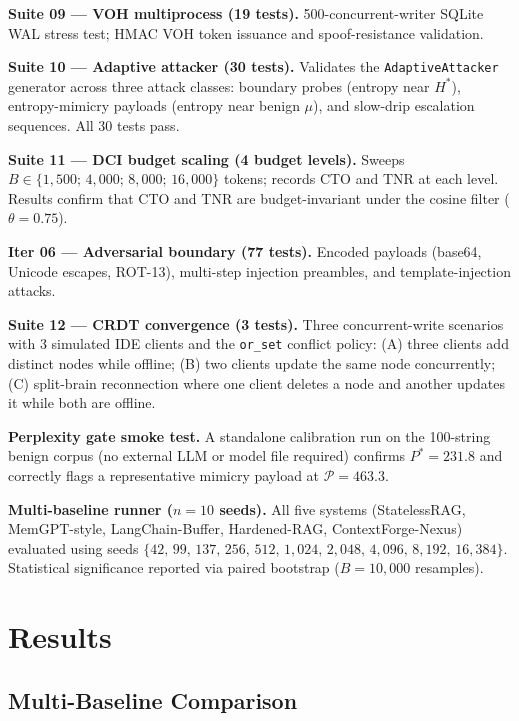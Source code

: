 \documentclass[11pt,twocolumn]{article}
\begin{document}
\textbf{Suite 09 --- VOH multiprocess (19 tests).}
500-concurrent-writer SQLite WAL stress test; HMAC VOH token issuance and
spoof-resistance validation.

\textbf{Suite 10 --- Adaptive attacker (30 tests).}
Validates the \texttt{AdaptiveAttacker} generator across three attack classes:
boundary probes (entropy near $H^{*}$), entropy-mimicry payloads (entropy
near benign $\mu$), and slow-drip escalation sequences. All 30 tests pass.

\textbf{Suite 11 --- DCI budget scaling (4 budget levels).}
Sweeps $B \in \{1{,}500;\,4{,}000;\,8{,}000;\,16{,}000\}$ tokens; records CTO
and TNR at each level. Results confirm that CTO and TNR are budget-invariant
under the cosine filter ($\theta=0.75$).

\textbf{Iter 06 --- Adversarial boundary (77 tests).}
Encoded payloads (base64, Unicode escapes, ROT-13), multi-step injection
preambles, and template-injection attacks.

\textbf{Suite 12 --- CRDT convergence (3 tests).}
Three concurrent-write scenarios with 3 simulated IDE clients and the
\texttt{or\_set} conflict policy: (A) three clients add distinct nodes while
offline; (B) two clients update the same node concurrently; (C) split-brain
reconnection where one client deletes a node and another updates it while
both are offline.

\textbf{Perplexity gate smoke test.}
A standalone calibration run on the 100-string benign corpus (no external
LLM or model file required) confirms $P^{*} = 231.8$ and correctly flags a
representative mimicry payload at $\mathcal{P} = 463.3$.

\textbf{Multi-baseline runner ($n=10$ seeds).}
All five systems (StatelessRAG, MemGPT-style, LangChain-Buffer, Hardened-RAG,
ContextForge-Nexus) evaluated using seeds
$\{42,\,99,\,137,\,256,\,512,\,1{,}024,\,2{,}048,\,4{,}096,\,8{,}192,\,16{,}384\}$.
Statistical significance reported via paired bootstrap ($B=10{,}000$ resamples).

\section{Results}
\label{sec:results}

\subsection{Multi-Baseline Comparison}
\label{sec:multibaseline}
\end{document}
